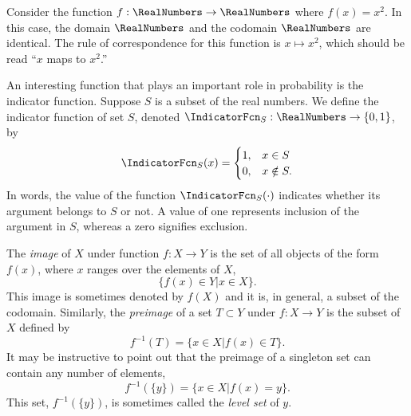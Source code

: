 \begin{example}
Consider the function $f: \RealNumbers \rightarrow \RealNumbers$ where $f(x) = x^2$.
In this case, the domain $\RealNumbers$ and the codomain $\RealNumbers$ are identical.
The rule of correspondence for this function is $x \mapsto x^2$, which should be read ``$x$ maps to $x^2$.''
\end{example}

\begin{example}
An interesting function that plays an important role in probability is the indicator function.
Suppose $S$ is a subset of the real numbers.
We define the indicator function of set $S$, denoted $\IndicatorFcn_S: \RealNumbers \rightarrow \{ 0, 1 \}$, by
\begin{equation*}
\IndicatorFcn_S (x) = \begin{cases} 1, & x \in S\\
0, & x \notin S . \end{cases}
\end{equation*}
In words, the value of the function $\IndicatorFcn_S (\cdot)$ indicates whether its argument belongs to $S$ or not.
A value of one represents inclusion of the argument in $S$, whereas a zero signifies exclusion.
\end{example}

The \emph{image} of $X$ under function $f: X \rightarrow Y$ is the set of all objects of the form $f(x)$, where $x$ ranges over the elements of $X$,
\begin{equation*}
\{ f(x) \in Y | x \in X \} .
\end{equation*}
This image is sometimes denoted by $f(X)$ and it is, in general, a subset of the codomain.
Similarly, the \emph{preimage} of a set $T \subset Y$ under $f: X \rightarrow Y$ is the subset of $X$ defined by
\begin{equation*}
f^{-1} (T) = \{ x \in X | f(x) \in T \} .
\end{equation*}
It may be instructive to point out that the preimage of a singleton set can contain any number of elements,
\begin{equation*}
f^{-1} (\{ y \}) = \{ x \in X | f(x) = y \} .
\end{equation*}
This set, $f^{-1} (\{ y \})$, is sometimes called the \emph{level set} of $y$.

